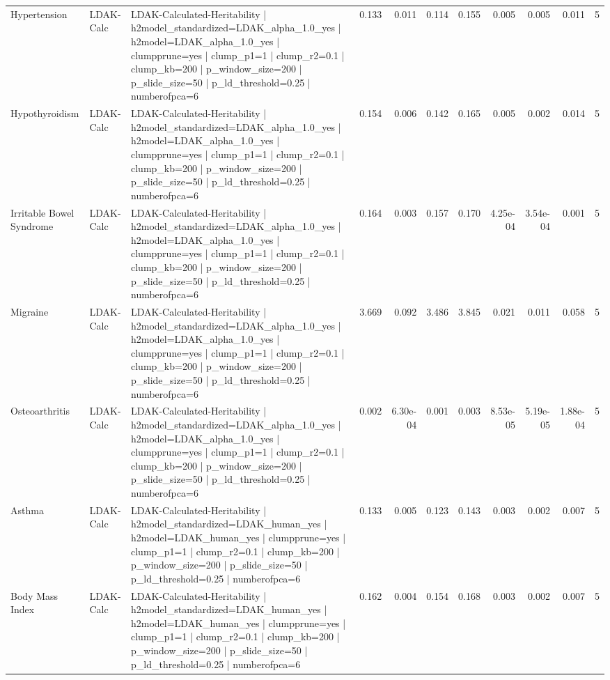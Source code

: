 \begin{landscape}
\begin{longtable}{p{2.4cm}p{1.8cm}p{6.0cm}rrrrrrrr}
Hypertension & LDAK-Calc & LDAK-Calculated-Heritability | h2model\_standardized=LDAK\_alpha\_1.0\_yes | h2model=LDAK\_alpha\_1.0\_yes | clumpprune=yes | clump\_p1=1 | clump\_r2=0.1 | clump\_kb=200 | p\_window\_size=200 | p\_slide\_size=50 | p\_ld\_threshold=0.25 | numberofpca=6 & 0.133 & 0.011 & 0.114 & 0.155 & 0.005 & 0.005 & 0.011 & 5 \\
Hypothyroidism & LDAK-Calc & LDAK-Calculated-Heritability | h2model\_standardized=LDAK\_alpha\_1.0\_yes | h2model=LDAK\_alpha\_1.0\_yes | clumpprune=yes | clump\_p1=1 | clump\_r2=0.1 | clump\_kb=200 | p\_window\_size=200 | p\_slide\_size=50 | p\_ld\_threshold=0.25 | numberofpca=6 & 0.154 & 0.006 & 0.142 & 0.165 & 0.005 & 0.002 & 0.014 & 5 \\
Irritable Bowel Syndrome & LDAK-Calc & LDAK-Calculated-Heritability | h2model\_standardized=LDAK\_alpha\_1.0\_yes | h2model=LDAK\_alpha\_1.0\_yes | clumpprune=yes | clump\_p1=1 | clump\_r2=0.1 | clump\_kb=200 | p\_window\_size=200 | p\_slide\_size=50 | p\_ld\_threshold=0.25 | numberofpca=6 & 0.164 & 0.003 & 0.157 & 0.170 & 4.25e-04 & 3.54e-04 & 0.001 & 5 \\
Migraine & LDAK-Calc & LDAK-Calculated-Heritability | h2model\_standardized=LDAK\_alpha\_1.0\_yes | h2model=LDAK\_alpha\_1.0\_yes | clumpprune=yes | clump\_p1=1 | clump\_r2=0.1 | clump\_kb=200 | p\_window\_size=200 | p\_slide\_size=50 | p\_ld\_threshold=0.25 | numberofpca=6 & 3.669 & 0.092 & 3.486 & 3.845 & 0.021 & 0.011 & 0.058 & 5 \\
Osteoarthritis & LDAK-Calc & LDAK-Calculated-Heritability | h2model\_standardized=LDAK\_alpha\_1.0\_yes | h2model=LDAK\_alpha\_1.0\_yes | clumpprune=yes | clump\_p1=1 | clump\_r2=0.1 | clump\_kb=200 | p\_window\_size=200 | p\_slide\_size=50 | p\_ld\_threshold=0.25 | numberofpca=6 & 0.002 & 6.30e-04 & 0.001 & 0.003 & 8.53e-05 & 5.19e-05 & 1.88e-04 & 5 \\
Asthma & LDAK-Calc & LDAK-Calculated-Heritability | h2model\_standardized=LDAK\_human\_yes | h2model=LDAK\_human\_yes | clumpprune=yes | clump\_p1=1 | clump\_r2=0.1 | clump\_kb=200 | p\_window\_size=200 | p\_slide\_size=50 | p\_ld\_threshold=0.25 | numberofpca=6 & 0.133 & 0.005 & 0.123 & 0.143 & 0.003 & 0.002 & 0.007 & 5 \\
Body Mass Index & LDAK-Calc & LDAK-Calculated-Heritability | h2model\_standardized=LDAK\_human\_yes | h2model=LDAK\_human\_yes | clumpprune=yes | clump\_p1=1 | clump\_r2=0.1 | clump\_kb=200 | p\_window\_size=200 | p\_slide\_size=50 | p\_ld\_threshold=0.25 | numberofpca=6 & 0.162 & 0.004 & 0.154 & 0.168 & 0.003 & 0.002 & 0.007 & 5 \\

\end{longtable}
\end{landscape}
